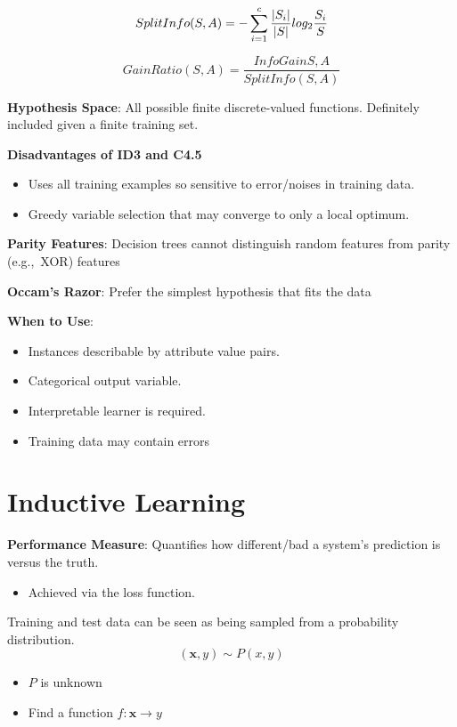 \documentclass[10pt]{article}
\DeclarePairedDelimiter{\abs}{\lvert}{\rvert}
\begin{document}
\begin{multicols}{3}
  \[SplitInfo(S,A) = -\sum_{i=1}^{c} \frac{\abs{S_i}}{\abs{S}} log_{2} \frac{S_i}{S} \]

  \[ GainRatio(S,A) = \frac{InfoGain{S,A}}{SplitInfo(S,A)} \]

  \textbf{Hypothesis Space}: All possible finite discrete-valued functions.  Definitely included given a finite training set.

  \textbf{Disadvantages of ID3 and C4.5}
  \begin{itemize}
    \item Uses all training examples so sensitive to error/noises in training data.
    \item Greedy variable selection that may converge to only a local optimum.
  \end{itemize}

  \textbf{Parity Features}: Decision trees cannot distinguish random features from parity (e.g.,~XOR) features

  \textbf{Occam's Razor}: Prefer the simplest hypothesis that fits the data

  \textbf{When to Use}:
  \begin{itemize}
    \item Instances describable by attribute value pairs.
    \item Categorical output variable.
    \item Interpretable learner is required.
    \item Training data may contain errors
  \end{itemize}

  \section{Inductive Learning}

  \textbf{Performance Measure}: Quantifies how different/bad a system's prediction is versus the truth.
  \begin{itemize}
    \item Achieved via the loss function.
  \end{itemize}

  Training and test data can be seen as being sampled from a probability distribution.
  \[(\mathbf{x},y)\sim P(x,y)\]
  \begin{itemize}
    \item $P$ is unknown
    \item Find a function $f:\mathbf{x} \rightarrow y$
  \end{itemize}


\end{multicols}
\end{document}
